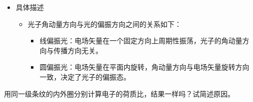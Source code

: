 \documentclass[dvipsnames, svgnames,a4paper,11pt]{article}
\begin{document}
\begin{itemize}
		\item 具体描述
		\begin{itemize}
			\item 光子角动量方向与光的偏振方向之间的关系如下：
			\begin{itemize}
				\item 线偏振光：电场矢量在一个固定方向上周期性振荡，光子的角动量方向与传播方向无关。
				\item 圆偏振光：电场矢量在平面内旋转，角动量方向与电场矢量旋转方向一致，决定了光子的偏振态。
			\end{itemize}
		\end{itemize}
	\end{itemize}
	
	
	\begin{question}
		用同一级条纹的内外圈分别计算电子的荷质比，结果一样吗？试简述原因。
	\end{question}
\end{document}
